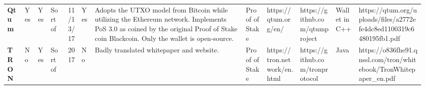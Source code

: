 \begin{table}[htbp]
\begin{adjustbox}{width=25cm, height=6cm, angle=270}
\begin{tabular}{llllrlp{17.915em}rlrrr}
      \rowcolor[rgb]{ .267,  .447,  .769} \textcolor[rgb]{ 1,  1,  1}{\textbf{Qtum}} & \cellcolor[rgb]{ .776,  .937,  .808}\textcolor[rgb]{ 0,  .38,  0}{Yes} & \cellcolor[rgb]{ .776,  .937,  .808}\textcolor[rgb]{ 0,  .38,  0}{Yes} & \cellcolor[rgb]{ 1,  .922,  .612}\textcolor[rgb]{ .612,  .341,  0}{Sort of} & \cellcolor[rgb]{ 1,  1,  1}11/13/17 & \cellcolor[rgb]{ .776,  .937,  .808}\textcolor[rgb]{ 0,  .38,  0}{Yes} & \cellcolor[rgb]{ .851,  .882,  .949}\textcolor[rgb]{ .188,  .329,  .588}{Adopts the UTXO model from Bitcoin while utilizing the Ethereum network. Implements PoS 3.0 as coined by the original Proof of Stake coin Blackcoin. Only the wallet is open-source.} & \multicolumn{1}{l}{\cellcolor[rgb]{ .851,  .882,  .949}\textcolor[rgb]{ .188,  .329,  .588}{Proof of Stake}} & \cellcolor[rgb]{ 1,  1,  1}https://qtum.org/en/ & \multicolumn{1}{l}{\cellcolor[rgb]{ 1,  1,  1}https://github.com/qtumproject} & \multicolumn{1}{l}{\cellcolor[rgb]{ .851,  .882,  .949}\textcolor[rgb]{ .188,  .329,  .588}{Wallet in C++}} & \multicolumn{1}{l}{\cellcolor[rgb]{ 1,  1,  1}https://qtum.org/uploads/files/a2772efe4dc8ed1100319c6480195fb1.pdf} \\
      \rowcolor[rgb]{ .267,  .447,  .769} \textcolor[rgb]{ 1,  1,  1}{\textbf{TRON}} & \cellcolor[rgb]{ 1,  .78,  .808}\textcolor[rgb]{ .612,  0,  .024}{No} & \cellcolor[rgb]{ .776,  .937,  .808}\textcolor[rgb]{ 0,  .38,  0}{Yes} & \cellcolor[rgb]{ 1,  .922,  .612}\textcolor[rgb]{ .612,  .341,  0}{Sort of} & \cellcolor[rgb]{ .851,  .882,  .949}\textcolor[rgb]{ .188,  .329,  .588}{2017} & \cellcolor[rgb]{ 1,  .78,  .808}\textcolor[rgb]{ .612,  0,  .024}{No} & \cellcolor[rgb]{ 1,  1,  1}\textcolor[rgb]{ .188,  .329,  .588}{Badly translated whitepaper and website.} & \multicolumn{1}{l}{\cellcolor[rgb]{ .851,  .882,  .949}\textcolor[rgb]{ .188,  .329,  .588}{Proof of Stake}} & \cellcolor[rgb]{ .851,  .882,  .949}\textcolor[rgb]{ .188,  .329,  .588}{https://tron.network/en.html} & \multicolumn{1}{l}{\cellcolor[rgb]{ .851,  .882,  .949}\textcolor[rgb]{ .188,  .329,  .588}{https://github.com/tronprotocol}} & \multicolumn{1}{l}{\cellcolor[rgb]{ .851,  .882,  .949}\textcolor[rgb]{ .188,  .329,  .588}{Java}} & \multicolumn{1}{l}{\cellcolor[rgb]{ .851,  .882,  .949}\textcolor[rgb]{ .188,  .329,  .588}{https://o836fhe91.qnssl.com/tron/whitebook/TronWhitepaper\_en.pdf}} \\

\end{tabular}
\end{adjustbox}
\end{table}
